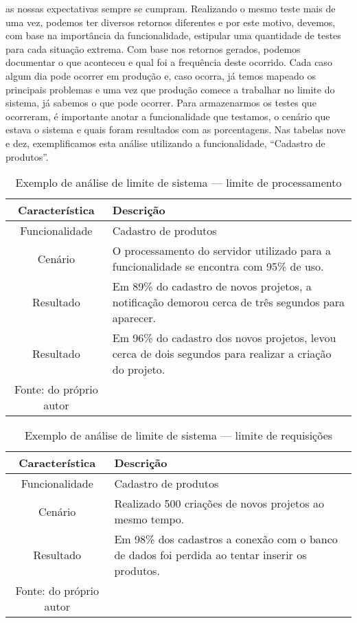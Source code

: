      as nossas expectativas sempre se cumpram. Realizando o mesmo teste mais de
      uma vez, podemos ter diversos retornos diferentes e por este motivo, devemos,
      com base na importância da funcionalidade, estipular uma quantidade de testes
      para cada situação extrema. Com base nos retornos gerados, podemos documentar
      o que aconteceu e qual foi a frequência deste ocorrido. Cada caso algum dia
      pode ocorrer em produção e, caso ocorra, já temos mapeado os principais
      problemas e uma vez que produção comece a trabalhar no limite do sistema,
      já sabemos o que pode ocorrer. Para armazenarmos os testes que ocorreram,
      é importante anotar a funcionalidade que testamos, o cenário que estava o
      sistema e quais foram resultados com as porcentagens. Nas tabelas nove e dez,
      exemplificamos esta análise utilizando a funcionalidade, “Cadastro de produtos”.

      \begin{table}[h!]
        \centering
        \label{Tabela:9}
        \caption{Exemplo de análise de limite de sistema — limite de processamento}
        \begin{tabular}{c p{9cm}}
          \hline
          \textbf{Característica} &
          \textbf{Descrição} \\
          \hline
          Funcionalidade &
          Cadastro de produtos \\
          Cenário &
          O processamento do servidor utilizado para a funcionalidade se encontra
          com 95\% de uso. \\
          Resultado &
          Em 89\% do cadastro de novos projetos, a notificação demorou cerca de
          três segundos para aparecer. \\
          Resultado &
          Em 96\% do cadastro dos novos projetos, levou cerca de dois
          segundos para realizar a criação do projeto. \\ \hline
          \newline
          \small{Fonte: do próprio autor}
        \end{tabular}
      \end{table}

      \begin{table}[h!]
        \centering
        \label{Tabela:10}
        \caption{Exemplo de análise de limite de sistema — limite de requisições}
        \begin{tabular}{c p{9cm}}
          \hline
          \textbf{Característica} &
          \textbf{Descrição} \\
          \hline
          Funcionalidade &
          Cadastro de produtos \\
          Cenário &
          Realizado 500 criações de novos projetos ao mesmo tempo. \\
          Resultado &
          Em 98\% dos cadastros a conexão com o banco de dados foi perdida ao tentar
          inserir os produtos. \\ \hline
          \newline
          \small{Fonte: do próprio autor}
        \end{tabular}
      \end{table}

